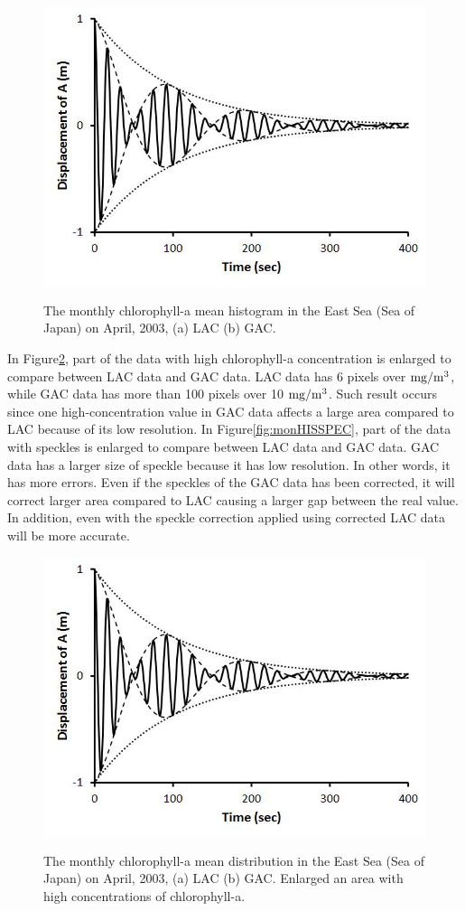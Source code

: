 \begin{figure}[b]
	\centering
	\includegraphics[width=0.8\linewidth]{../images/monHIS}\\
	\caption{The monthly chlorophyll-a mean histogram in the East Sea (Sea of Japan) on April, 2003, (a) LAC (b) GAC.}
	\label{fig:monHIS}
\end{figure}
 
In Figure\ref{fig:monHISHI}, part of the data with high chlorophyll-a concentration is enlarged to compare between LAC data and GAC data. LAC data has 6 pixels over $\rm mg/m^3$, while GAC data has more than 100 pixels over 10 $\rm mg/m^3$. Such result occurs since one high-concentration value in GAC data affects a large area compared to LAC because of its low resolution.
In Figure\ref{fig:monHISSPEC}, part of the data with speckles is enlarged to compare between LAC data and GAC data. GAC data has a larger size of speckle because it has low resolution. In other words, it has more errors. Even if the speckles of the GAC data has been corrected, it will correct larger area compared to LAC causing a larger gap between the real value. In addition, even with the speckle correction applied using corrected LAC data will be more accurate.
    
  \begin{figure}[b]
  	\centering
  	\includegraphics[width=0.8\linewidth]{../images/monHISHI}\\
  	\caption{The monthly chlorophyll-a mean distribution in the East Sea (Sea of Japan) on April, 2003, (a) LAC (b) GAC. Enlarged an area with high concentrations of chlorophyll-a.}
  	\label{fig:monHISHI}
  \end{figure}
  
